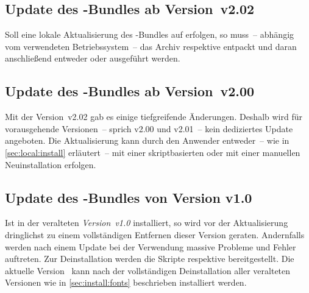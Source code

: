 \subsection{Update des \TUDScript-Bundles ab Version~v2.02}
Soll eine lokale Aktualisierung des \TUDScript-Bundles auf \vTUDScript{} 
erfolgen, so muss~-- abhängig vom verwendeten Betriebssystem~-- das Archiv
%
{} respektive 
%
{}
entpackt und daran anschließend entweder  
oder  ausgeführt werden.

\subsection{Update des \TUDScript-Bundles ab Version~v2.00}
%
Mit der Version~v2.02 gab es einige tiefgreifende Änderungen. Deshalb wird für 
vorausgehende Versionen~-- sprich v2.00 und v2.01~-- kein dediziertes Update 
angeboten. Die Aktualisierung kann durch den Anwender entweder~-- wie in 
\autoref{sec:local:install} erläutert~-- mit einer skriptbasierten oder mit 
einer manuellen Neuinstallation erfolgen.
%


\subsection{Update des \TUDScript-Bundles von Version v1.0}
%
Ist \TUDScript in der veralteten \emph{Version~v1.0} installiert, so wird vor 
der Aktualisierung dringlichst zu einem vollständigen Entfernen dieser Version 
geraten. Andernfalls werden nach einem Update bei der Verwendung massive 
Probleme und Fehler auftreten. Zur Deinstallation werden die Skripte 
respektive
bereitgestellt. Die aktuelle Version~\vTUDScript{} kann nach der vollständigen 
Deinstallation aller veralteten Versionen wie in \autoref{sec:install:fonts} 
beschrieben installiert werden.

